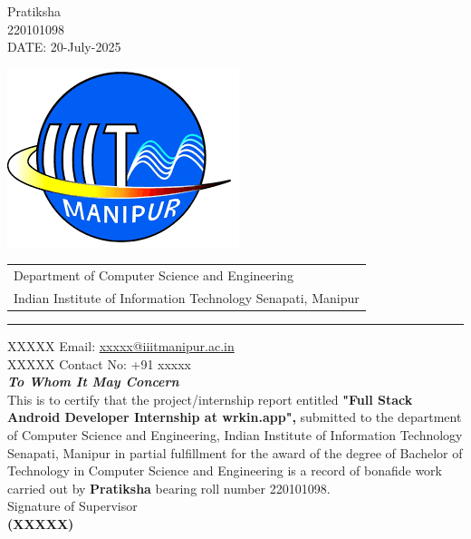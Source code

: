 \documentclass[a4paper, 11pt, oneside]{report}
\begin{document}
\vspace{1cm}\hspace{7cm} Pratiksha \\
\vspace{1cm}\hspace{9cm} 220101098 \\
\vspace{1cm} DATE: 20-July-2025

\newpage

\begin{center}
  \thispagestyle{empty}
  \begin{table}[h]
    \centering
    \includegraphics[scale=0.2]{report_file/iiit manipur.png}
    \begin{tabular}{l}
      Department of Computer Science and Engineering \\
      Indian Institute of Information Technology Senapati, Manipur \\
    \end{tabular}
  \end{table}
  \par\noindent\rule{\textwidth}{0.4pt}
  XXXXX \hspace*{\fill} Email: \href{mailto:xxxxx@iiitmanipur.ac.in}{xxxxx@iiitmanipur.ac.in}\\
  XXXXX \hspace*{0pt}\hfill Contact No: +91 xxxxx\\[2cm]
  {\Huge \textbf{\emph{To Whom It May Concern}}}\\[2cm]
  \linespread{1.13}
  \large{This is to certify that the project/internship report entitled \textbf{"Full Stack Android Developer Internship at wrkin.app",} submitted to the department of Computer Science and Engineering, Indian Institute of Information Technology Senapati, Manipur in partial fulfillment for the award of the degree of Bachelor of Technology in Computer Science and Engineering is a record of bonafide work carried out by \textbf{Pratiksha} bearing roll number 220101098.}\\[2cm]
  \hspace*{2.6in}\large{Signature of Supervisor}\\[0.3cm]
  \hspace*{2.5in}\textbf{(XXXXX)}\\[0.5cm]
\end{center}
\end{document}
